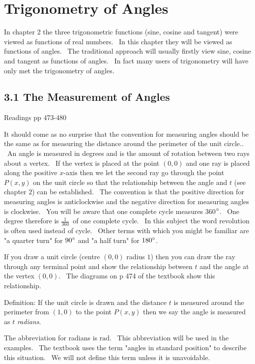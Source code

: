 \chapter{Trigonometry of Angles}

In chapter 2 the three trigonometric functions (sine, cosine and tangent) were viewed as functions of real numbers. \ In
this chapter they will be viewed as functions of angles. \ The traditional approach will usually firstly view
sine, cosine and tangent as functions of angles. \ In fact many users of trigonometry will have only met the trigonometry
of angles. 

\section{3.1 The Measurement of Angles}
Readings pp 473-480 

It should come as no surprise that the convention for measuring angles should be the same as for measuring
the distance around the perimeter of the unit circle.. \ An angle is measured in degrees and is the amount of
rotation between two rays about a vertex. \ If the vertex is placed at the point $\left (0 ,0\right )$ and one ray is placed along the positive $x$-axis then we let the second ray go through the point $P (x ,y)$ on the unit circle so that the relationship between the angle and $t$ (see chapter $2$) can be established. \ The convention is that the positive direction for measuring
angles is anticlockwise and the negative direction for measuring angles is clockwise. \ You will be aware that
one complete cycle measures 360$\mbox{{\ensuremath{{}^\circ}}}$. \ One degree therefore is $\frac{1}{360}$\ of one complete cycle. \ In this subject the
word revolution is often used instead of cycle. \ Other terms with which you might be familiar are "a quarter
turn" for $90 \mbox{{\ensuremath{{}^\circ}}}$ and "a half turn" for $180 \mbox{{\ensuremath{{}^\circ}}}$. 

If you draw a unit circle (centre $\left (0 ,0\right )$ radius $1$) then you can draw the ray through any terminal point and show the relationship between $t$ and the angle at the vertex $\left (0 ,0\right )$. \ The diagrams on p
474 of the textbook show this relationship. 

Definition: If the unit circle is drawn and the distance $t$ is measured around the perimeter from $\left (1 ,0\right )$ to the point $P (x ,y)$ then we say the angle is measured as $t$ \emph{radians}. 

The abbreviation for radians is $\mbox{rad}$. \ This abbreviation will be used in the examples.
\ The textbook uses the term "angles in standard position" to describe this situation. \ We
will not define this term unless it is unavoidable. 

